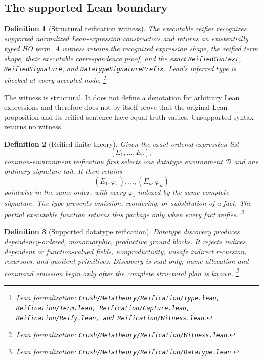 \documentclass[11pt]{article}
\newtheorem{definition}{Definition}[section]
\theoremstyle{remark}
\newcommand{\leanfile}[1]{\footnote{Lean formalization: \texttt{Crush/Metatheory/#1}.}}
\newcommand{\leanfiles}[1]{\footnote{Lean formalization: \texttt{Crush/Metatheory/#1}.}}
\begin{document}
\subsection{The supported Lean boundary}

\begin{definition}[Structural reification witness]
The executable reifier recognizes supported normalized Lean-expression
constructors and returns an existentially typed HO term. A witness retains the
recognized expression shape, the reified term shape, their executable
correspondence proof, and the exact \texttt{ReifiedContext},
\texttt{ReifiedSignature}, and \texttt{DatatypeSignaturePrefix}. Lean's inferred type is checked at every
accepted node.
\leanfiles{Reification/Type.lean, Reification/Term.lean, Reification/Capture.lean, Reification/Reify.lean, and Reification/Witness.lean}
\end{definition}

The witness is structural. It does not define a denotation for arbitrary Lean
expressions and therefore does not by itself prove that the original Lean
proposition and its reified sentence have equal truth values. Unsupported
syntax returns no witness.

\begin{definition}[Reified finite theory]
Given the exact ordered expression list
\[
 [E_1,\ldots,E_n],
\]
common-environment reification first selects one datatype environment $\mathcal D$ and one
ordinary signature tail. It then retains
\[
 (E_1,\varphi_1),\ldots,(E_n,\varphi_n)
\]
pointwise in the same order, with every $\varphi_i$ indexed by the same complete
signature. The type  prevents omission,
reordering, or substitution of a fact. The partial executable function
 returns this package only when every fact reifies.
\leanfile{Reification/Witness.lean}
\end{definition}

\begin{definition}[Supported datatype reification]
Datatype discovery produces dependency-ordered, monomorphic, productive ground
blocks. It rejects indices, dependent or function-valued fields,
nonproductivity, unsafe indirect recursion, recursors, and quotient primitives.
Discovery is read-only; name allocation and command emission begin only after
the complete structural plan is known.
\leanfile{Reification/Datatype.lean}
\end{definition}
\end{document}
